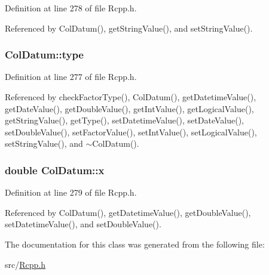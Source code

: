 Definition at line 278 of file Rcpp.h.

Referenced by ColDatum(), getStringValue(), and setStringValue().\hypertarget{classColDatum_ac539e7f62828f2683f1825a84a19d231}{
\subsubsection[{type}]{ {\bf ColDatum::type}}}
\label{classColDatum_ac539e7f62828f2683f1825a84a19d231}


Definition at line 277 of file Rcpp.h.

Referenced by checkFactorType(), ColDatum(), getDatetimeValue(), getDateValue(), getDoubleValue(), getIntValue(), getLogicalValue(), getStringValue(), getType(), setDatetimeValue(), setDateValue(), setDoubleValue(), setFactorValue(), setIntValue(), setLogicalValue(), setStringValue(), and $\sim$ColDatum().\hypertarget{classColDatum_a6d3d286cbd6c4ad24f1f12266662e42e}{
\subsubsection[{x}]{\setlength{\rightskip}{0pt plus 5cm}double {\bf ColDatum::x}}}
\label{classColDatum_a6d3d286cbd6c4ad24f1f12266662e42e}


Definition at line 279 of file Rcpp.h.

Referenced by ColDatum(), getDatetimeValue(), getDoubleValue(), setDatetimeValue(), and setDoubleValue().

The documentation for this class was generated from the following file:\begin{DoxyCompactItemize}
\item 
src/\hyperlink{Rcpp_8h}{Rcpp.h}\end{DoxyCompactItemize}
